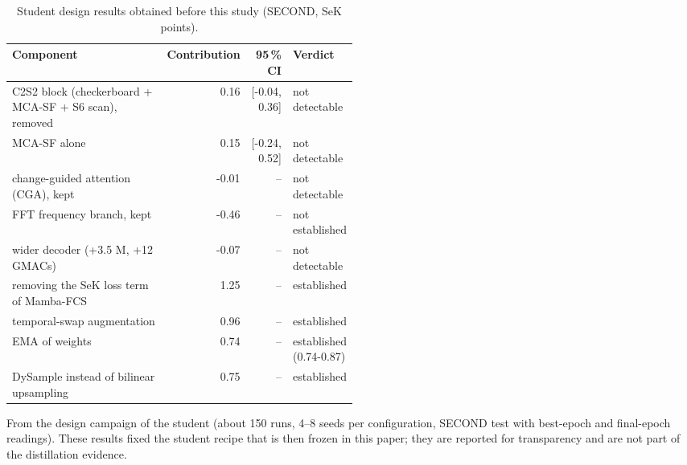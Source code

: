 \begin{table}[!t]
\centering
\footnotesize
\caption{Student design results obtained before this study (SECOND, SeK points).}
\label{tab:s-student-design}
\begin{tabular}{p{0.5\linewidth}rrl}
\toprule
Component & Contribution & 95\,\% CI & Verdict \\
\midrule
C2S2 block (checkerboard + MCA-SF + S6 scan), removed & 0.16 & [-0.04, 0.36] & not detectable \\
MCA-SF alone & 0.15 & [-0.24, 0.52] & not detectable \\
change-guided attention (CGA), kept & -0.01 & -- & not detectable \\
FFT frequency branch, kept & -0.46 & -- & not established \\
wider decoder (+3.5 M, +12 GMACs) & -0.07 & -- & not detectable \\
removing the SeK loss term of Mamba-FCS & 1.25 & -- & established \\
temporal-swap augmentation & 0.96 & -- & established \\
EMA of weights & 0.74 & -- & established (0.74-0.87) \\
DySample instead of bilinear upsampling & 0.75 & -- & established \\
\bottomrule
\end{tabular}
\par\smallskip\parbox{\linewidth}{\scriptsize From the design campaign of the student (about 150 runs, 4--8 seeds per configuration, SECOND test with best-epoch and final-epoch readings). These results fixed the student recipe that is then frozen in this paper; they are reported for transparency and are not part of the distillation evidence.}
\end{table}
